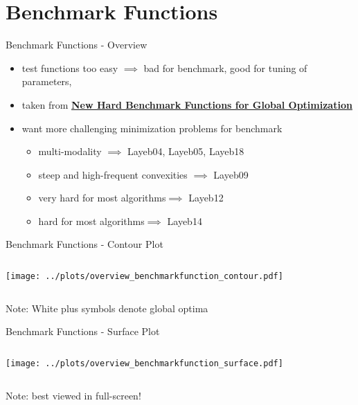 \documentclass[11pt,aspectratio=169]{beamer}
\begin{document}
\section{Benchmark Functions}

\begin{frame}[fragile]{Benchmark Functions - Overview}
    \begin{itemize}
        \item test functions too easy $\implies$ bad for benchmark, good for tuning of parameters, 
        \item taken from \href{https://arxiv.org/abs/2202.04606}{\textbf{New Hard Benchmark Functions for Global Optimization}}
        \item want more challenging minimization problems for benchmark
            \begin{itemize}
                \item multi-modality $\implies$ Layeb04, Layeb05, Layeb18
                \item steep and high-frequent convexities $\implies$ Layeb09
                \item very hard for most algorithms\footnotemark[1] $\implies$ Layeb12 \item hard for most algorithms\footnotemark[1] $\implies$ Layeb14
            \end{itemize}
    \end{itemize}

\end{frame}

\begin{frame}[fragile]{Benchmark Functions - Contour Plot}
    \begin{columns}
    \begin{column}{0.8\textwidth}
        \texttt{[image: ../plots/overview\_benchmarkfunction\_contour.pdf]}
    \end{column}
    \end{columns}
    \tiny{Note: White plus symbols denote global optima}
\end{frame}

\begin{frame}[fragile]{Benchmark Functions - Surface Plot}
    \begin{columns}
    \begin{column}{0.8\textwidth}
        \texttt{[image: ../plots/overview\_benchmarkfunction\_surface.pdf]}
    \end{column}
    \end{columns}
    \tiny{Note: best viewed in full-screen!}
\end{frame}
\end{document}
